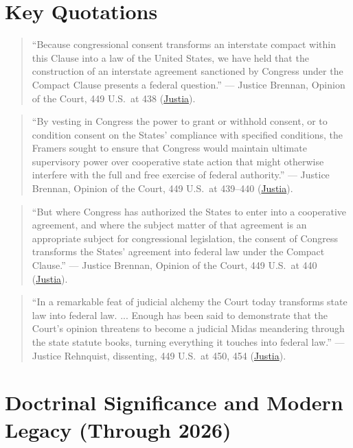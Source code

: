 \documentclass[12pt]{article}
\begin{document}
\section{Key Quotations}

\begin{quote}
``Because congressional consent transforms an interstate compact within this Clause into a law of the United States, we have held that the construction of an interstate agreement sanctioned by Congress under the Compact Clause presents a federal question.'' --- Justice Brennan, Opinion of the Court, 449 U.S.\ at 438 (\href{https://supreme.justia.com/cases/federal/us/449/433/}{Justia}).
\end{quote}

\begin{quote}
``By vesting in Congress the power to grant or withhold consent, or to condition consent on the States' compliance with specified conditions, the Framers sought to ensure that Congress would maintain ultimate supervisory power over cooperative state action that might otherwise interfere with the full and free exercise of federal authority.'' --- Justice Brennan, Opinion of the Court, 449 U.S.\ at 439--440 (\href{https://supreme.justia.com/cases/federal/us/449/433/}{Justia}).
\end{quote}

\begin{quote}
``But where Congress has authorized the States to enter into a cooperative agreement, and where the subject matter of that agreement is an appropriate subject for congressional legislation, the consent of Congress transforms the States' agreement into federal law under the Compact Clause.'' --- Justice Brennan, Opinion of the Court, 449 U.S.\ at 440 (\href{https://supreme.justia.com/cases/federal/us/449/433/}{Justia}).
\end{quote}

\begin{quote}
``In a remarkable feat of judicial alchemy the Court today transforms state law into federal law. ... Enough has been said to demonstrate that the Court's opinion threatens to become a judicial Midas meandering through the state statute books, turning everything it touches into federal law.'' --- Justice Rehnquist, dissenting, 449 U.S.\ at 450, 454 (\href{https://supreme.justia.com/cases/federal/us/449/433/}{Justia}).
\end{quote}

\section{Doctrinal Significance and Modern Legacy (Through 2026)}
\end{document}
